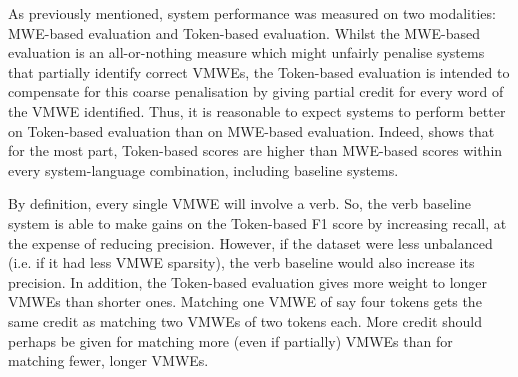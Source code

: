 \documentclass[output=paper
,modfonts
,nonflat,draftmode]{langsci/langscibook}
\begin{document}
\begin{comment}
Points to cover:
Brief description of evaluation methods
Discussion of performance of evaluation methods, mainly per-token. See how baselines perform un per-token evaluation.
Recommendation of a weighted per-token evaluation?
\end{comment}


As previously mentioned, system performance was measured on two modalities: MWE-based evaluation and Token-based evaluation. Whilst the MWE-based evaluation is an all-or-nothing measure which might unfairly penalise systems that partially identify correct VMWEs, the Token-based evaluation is intended to compensate for this coarse penalisation by giving partial credit for every word of the VMWE identified. Thus, it is reasonable to expect systems to perform better on Token-based evaluation than on MWE-based evaluation. Indeed,  shows that for the most part, Token-based scores are higher than MWE-based scores within every system-language combination, including baseline systems.

By definition, every single VMWE will involve a verb. So, the verb baseline system is able to make gains on the Token-based F1 score by increasing recall, at the expense of reducing precision. However, if the dataset were less unbalanced (i.e. if it had less VMWE sparsity), the verb baseline would also increase its precision. In addition, the Token-based evaluation gives more weight to longer VMWEs than shorter ones. Matching one VMWE of say four tokens gets the same credit as matching two VMWEs of two tokens each. More credit should perhaps be given for matching more (even if partially) VMWEs than for matching fewer, longer VMWEs. 

\end{document}

